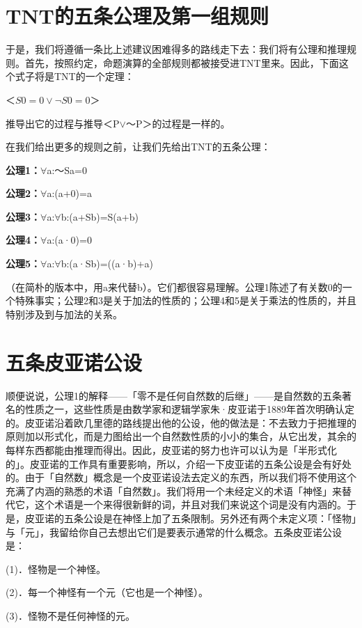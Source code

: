 \documentclass[
  12pt,
  twoside,
  openright,
  oldfontcommands,
]{memoir}
\newcommand{\heititext}[1]{{\heifamily\bfseries #1}}
\begin{document}
\section{TNT的五条公理及第一组规则}

于是，我们将遵循一条比上述建议困难得多的路线走下去：我们将有公理和推理规则。首先，按照约定，命题演算的全部规则都被接受进TNT里来。因此，下面这个式子将是TNT的一个定理：

$＜S0=0\vee \lnot S0=0＞$

推导出它的过程与推导＜P$\vee$～P＞的过程是一样的。

在我们给出更多的规则之前，让我们先给出TNT的五条公理：

\heititext{公理1：}$\forall$a:～Sa=0

\heititext{公理2：}$\forall$a:(a+0)=a

\heititext{公理3：}$\forall$a:$\forall$b:(a+Sb)=S(a+b)

\heititext{公理4：}$\forall$a:(a·0)=0

\heititext{公理5：}$\forall$a:$\forall$b:(a·Sb)=((a·b)+a)

（在简朴的版本中，用a\textquotesingle 来代替b）。它们都很容易理解。公理1陈述了有关数0的一个特殊事实；公理2和3是关于加法的性质的；公理4和5是关于乘法的性质的，并且特别涉及到与加法的关系。

\section{五条皮亚诺公设}

顺便说说，公理1的解释------「零不是任何自然数的后继」------是自然数的五条著名的性质之一，这些性质是由数学家和逻辑学家朱·皮亚诺于1889年首次明确认定的。皮亚诺沿着欧几里德的路线提出他的公设，他的做法是：不去致力于把推理的原则加以形式化，而是力图给出一个自然数性质的小小的集合，从它出发，其余的每样东西都能由推理而得出。因此，皮亚诺的努力也许可以认为是「半形式化的」。皮亚诺的工作具有重要影响，所以，介绍一下皮亚诺的五条公设是会有好处的。由于「自然数」概念是一个皮亚诺设法去定义的东西，所以我们将不使用这个充满了内涵的熟悉的术语「自然数」。我们将用一个未经定义的术语「神怪」来替代它，这个术语是一个来得很新鲜的词，并且对我们来说这个词是没有内涵的。于是，皮亚诺的五条公设是在神怪上加了五条限制。另外还有两个未定义项：「怪物」与「元」，我留给你自己去想出它们是要表示通常的什么概念。五条皮亚诺公设是：

(1)．怪物是一个神怪。

(2)．每一个神怪有一个元（它也是一个神怪）。

(3)．怪物不是任何神怪的元。
\end{document}
